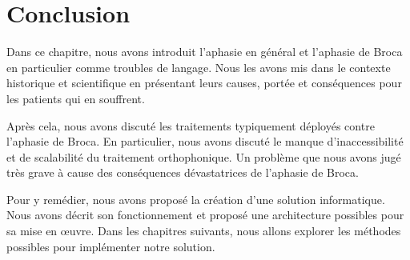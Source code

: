 \section{Conclusion}

Dans ce chapitre, nous avons introduit 
l'aphasie en général et l'aphasie de Broca en particulier comme troubles de langage.
Nous les avons mis dans le contexte historique et scientifique
en présentant leurs causes, portée et conséquences pour les patients qui en souffrent.

Après cela, nous avons discuté les traitements typiquement déployés contre l'aphasie de Broca.
En particulier, nous avons discuté le manque d'inaccessibilité et de scalabilité du traitement orthophonique.
Un problème que nous avons jugé très grave à cause des conséquences dévastatrices de l'aphasie de Broca.

Pour y remédier, nous avons proposé la création d'une solution informatique.
Nous avons décrit son fonctionnement et proposé une architecture possibles pour sa mise en œuvre.
Dans les chapitres suivants, nous allons explorer les méthodes possibles pour implémenter notre solution.